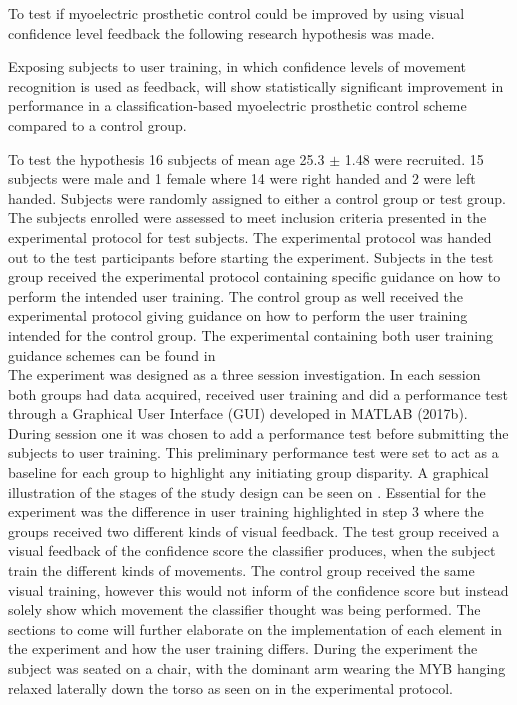 To test if myoelectric prosthetic control could be improved by using visual confidence level feedback the following research hypothesis was made.  
\begin{center}
	Exposing subjects to user training, in which confidence levels of movement recognition is used as feedback, will show statistically significant improvement in performance in a classification-based myoelectric prosthetic control scheme compared to a control group.
\end{center}


To test the hypothesis 16 subjects of mean age 25.3 $\pm$ 1.48 were recruited. 15 subjects were male and 1 female where 14 were right handed and 2 were left handed. Subjects were randomly assigned to either a control group or test group. The subjects enrolled were assessed to meet inclusion criteria presented in the experimental protocol for test subjects. The experimental protocol was handed out to the test participants before starting the experiment. Subjects in the test group received the experimental protocol containing specific guidance on how to perform the intended user training. The control group as well received the experimental protocol giving guidance on how to perform the user training intended for the control group. The experimental containing both user training guidance schemes can be found in  \\
The experiment was designed as a three session investigation. In each session both groups had data acquired, received user training and did a performance test through a Graphical User Interface (GUI) developed in MATLAB (2017b). During session one it was chosen to add a performance test before submitting the subjects to user training. This preliminary performance test were set to act as a baseline for each group to highlight any initiating group disparity. A graphical illustration of the stages of the study design can be seen on . Essential for the experiment was the difference in user training highlighted in step 3 where the groups received two different kinds of visual feedback. The test group received a visual feedback of the confidence score the classifier produces, when the subject train the different kinds of movements. The control group received the same visual training, however this would not inform of the confidence score but instead solely show which movement the classifier thought was being performed. The sections to come will further elaborate on the implementation of each element in the experiment and how the user training differs. During the experiment the subject was seated on a chair, with the dominant arm wearing the MYB hanging relaxed laterally down the torso as seen on  in the experimental protocol. 

